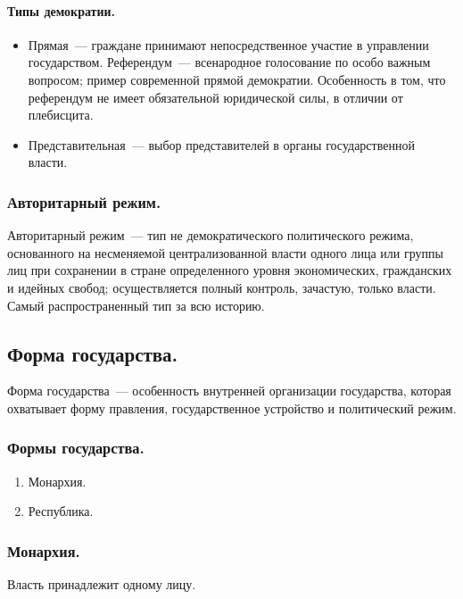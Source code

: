 \documentclass[12pt]{article}
\begin{document}
	\paragraph{Типы демократии.}
	\begin{itemize}
		\item Прямая~--- граждане принимают непосредственное участие в управлении государством. Референдум~--- всенародное голосование по особо важным вопросом; пример современной прямой демократии. Особенность в том, что референдум не имеет обязательной юридической силы, в отличии от плебисцита.
		\item Представительная~--- выбор представителей в органы государственной власти.
	\end{itemize}
	\subsubsection{Авторитарный режим.}
	\begin{definition}
		Авторитарный режим~--- тип не демократического политического режима, основанного на несменяемой централизованной власти одного лица или группы лиц при сохранении в стране определенного уровня экономических, гражданских и идейных свобод; осуществляется полный контроль, зачастую, только власти. Самый распространенный тип за всю историю.
	\end{definition}
	\subsection{Форма государства.}
	\begin{definition}
		Форма государства~--- особенность внутренней организации государства, которая охватывает форму правления, государственное устройство и политический режим.
	\end{definition}
	\subsubsection{Формы государства.}
	\begin{enumerate}
		\item Монархия.
		\item Республика.
	\end{enumerate}
	\subsubsection{Монархия.}
	\begin{definition}[Монархия]
		Власть принадлежит одному лицу.
	\end{definition}
\end{document}

